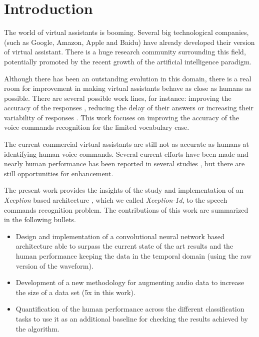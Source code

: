 \documentclass[review]{elsarticle}
\begin{document}
\linenumbers

\section{Introduction}
The world of virtual assistants is booming. Several big technological companies, (such as Google, Amazon, Apple and Baidu) have already developed their version of virtual assistant. There is a huge research community surrounding this field, potentially promoted by the recent growth of the artificial intelligence paradigm. 

Although there has been an outstanding evolution in this domain, there is a real room for improvement in making virtual assistants behave as close as humans as possible. There are several possible work lines, for instance: improving the accuracy of the responses \cite{milabot2017}, reducing the delay of their answers \cite{Han2017} or increasing their variability of responses \cite{Li2017}. This work focuses on improving the accuracy of the voice commands recognition for the limited vocabulary case.

 The current commercial virtual assistants are still not as accurate as humans at identifying human voice commands. Several current efforts have been made and nearly human performance has been reported in several studies \cite{Andrade2018, Wang2018, Zhang2017, Tara2015, McMahan2018}, but there are still opportunities for enhancement.
 
 The present work provides the insights of the study and implementation of an \textit{Xception} based architecture \cite{FChollet2017}, which we called \textit{Xception-1d}, to the speech commands recognition problem. The contributions of this work are summarized in the following bullets.
 
 \begin{itemize}
 	\item Design and implementation of a convolutional neural network based architecture able to surpass the current state of the art results and the human performance keeping the data in the temporal domain (using the raw version of the waveform).
 	 	
 	\item Development of a new methodology for augmenting audio data to increase the size of a data set (5x in this work).
 	
 	\item Quantification of the human performance across the different classification tasks to use it as an additional baseline for checking the results achieved by the algorithm.

 \end{itemize}
 
\end{document}
